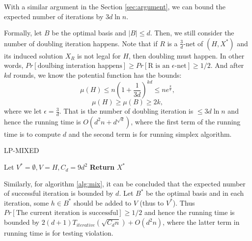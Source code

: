 \documentclass[11pt]{article}
\begin{document}
With 
a similar argument in the Section \ref{sec:argument}, we can bound the expected number of iterations by $3d\ln n$. 

Formally, let $B$ be the optimal basis and $|B|\leq d$. Then, we still consider the number of doubling iteration happens. 
Note that if $R$ is a $\frac{3}{d}$-net of $(H,X^*)$ and its induced solution $X_R$ is not legal for $H$, then doubling must happen. 
In other words, $  Pr[\text{doulbing interation happens}]\geq Pr[\text{R is an $\epsilon$-net}] \geq 1/2$. 
And after $kd$ rounds, we know the potential function has the bounds:
$$\mu(H)\leq n(1+\frac{1}{3d})^{kd}\leq ne^{\frac{k}{\epsilon}},$$
$$\mu(H)\geq \mu(B)\geq 2k,$$
where we let $\epsilon=\frac{3}{d}$. 
That is the number of doubling iteration is $\leq 3d\ln n$ and hence the running time is $O(d^2n+d^{\sqrt d})$, where 
	the first term of the running time is to compute $d$ and the second term is for running simplex algorithm. 

\begin{algorithm}[h]
	\caption{LP-MIXED}
	\label{alg:mix}
	Let $V^*=\emptyset, V=H, C_d=9d^2$\;
	{\bf Return} $X^*$\;
\end{algorithm}

Similarly, for algorithm \ref{alg:mix}, it can be concluded that the expected number of successful iteration  is bounded by $d$. 
Let $B^*$ be the optimal basis and in each iteration, some $h\in B^*$ should be added to $V$ (thus to $V^*$). 
Thus $Pr[\text{The current iteration is successful}]\geq 1/2$ and hence the running time is 
	bounded by $2(d+1)T_{iterative}(\sqrt{C_dn})+O(d^2 n)$, where the latter term in running time
	is for testing violation.
\cite{Seidel}


\end{document}
